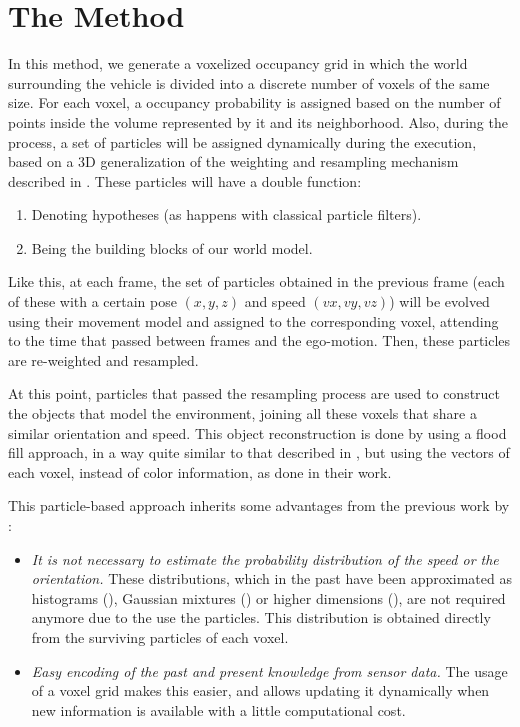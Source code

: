 \section{The Method}\label{ch:chapter05_01}

In this method, we generate a voxelized occupancy grid in which the world surrounding the vehicle is divided into a discrete number of voxels of the same size. For each voxel, a occupancy probability is assigned based on the number of points inside the volume represented by it and its neighborhood. Also, during the process, a set of particles will be assigned dynamically during the execution, based on a 3D generalization of the weighting and resampling mechanism described in \cite{isard1998condensation}. These particles will have a double function:
\begin{enumerate}
 \item Denoting hypotheses (as happens with classical particle filters).
 \item Being the building blocks of our world model.
\end{enumerate}

Like this, at each frame, the set of particles obtained in the previous frame (each of these with a certain pose ${(x, y, z)}$ and speed ${(vx, vy, vz)}$) will be evolved using their movement model and assigned to the corresponding voxel, attending to the time that passed between frames and the ego-motion. Then, these particles are re-weighted and resampled.

At this point, particles that passed the resampling process are used to construct the objects that model the environment, joining all these voxels that share a similar orientation and speed. This object reconstruction is done by using a flood fill approach, in a way quite similar to that described in \cite{broggi2013}, but using the vectors of each voxel, instead of color information, as done in their work.

This particle-based approach inherits some advantages from the previous work by \cite{danescu2012particle}:
\begin{itemize}
 \item \emph{It is not necessary to estimate the probability distribution of the speed or the orientation.} These distributions, which in the past have been approximated as histograms (\cite{chen2006dynamic}), Gaussian mixtures (\cite{gindele2009bayesian}) or higher dimensions (\cite{coue2006bayesian}), are not required anymore due to the use the particles. This distribution is obtained directly from the surviving particles of each voxel. 
 \item \emph{Easy encoding of the past and present knowledge from sensor data.} The usage of a voxel grid makes this easier, and allows updating it dynamically when new information is available with a little computational cost.
\end{itemize}

